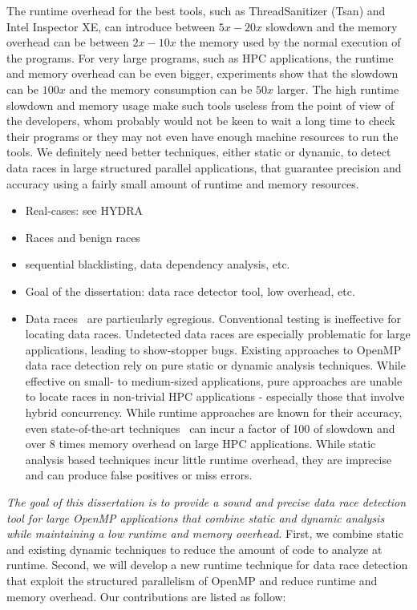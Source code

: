 The runtime overhead for the best tools, such as ThreadSanitizer (Tsan) and
Intel Inspector XE, can introduce between $5x-20x$ slowdown and the memory
overhead can be between $2x-10x$ the memory used by the normal execution of
the programs.
%
For very large programs, such as HPC applications, the runtime and memory
overhead can be even bigger, experiments show that the slowdown can be $100x$
and the memory consumption can be $50x$ larger.
%
The high runtime slowdown and memory usage make such tools useless from the
point of view of the developers, whom probably would not be keen to wait a
long time to check their programs or they may not even have enough machine
resources to run the tools.
%
We definitely need better techniques, either static or dynamic, to detect data
races in large structured parallel applications, that guarantee precision and
accuracy using a fairly small amount of runtime and memory resources.

\begin{itemize}
  \item Real-cases: see HYDRA
  \item Races and benign races
  \item sequential blacklisting, data dependency analysis, etc.
  \item Goal of the dissertation: data race detector tool, low overhead, etc.
  \item Data races~\cite{sus_common_2008} are particularly egregious.
    Conventional testing is ineffective for locating data races.
    Undetected data races are especially problematic for large applications,
    leading to show-stopper bugs.
    Existing approaches to OpenMP data race detection rely on pure static or
    dynamic analysis techniques.
    While effective on small- to medium-sized applications, pure approaches
    are unable to locate races in non-trivial HPC applications - especially
    those that involve hybrid concurrency.
    While runtime approaches are known for their accuracy, even
    state-of-the-art techniques~\cite{flanagan_fasttrack:_2009,tsan} can incur
    a factor of 100 of slowdown and over 8 times memory overhead on large HPC
    applications.
    While static analysis based techniques incur little runtime overhead, they
    are imprecise and can produce false positives or miss errors.
\end{itemize}

\emph{The goal of this dissertation is to provide a sound and precise data
  race detection tool for large OpenMP applications that combine static and
  dynamic analysis while maintaining a low runtime and memory overhead.}
%
First, we combine static and existing dynamic techniques to reduce the amount
of code to analyze at runtime.
%
Second, we will develop a new runtime technique for data race detection that
exploit the structured parallelism of OpenMP and reduce runtime and memory
overhead.
%
Our contributions are listed as follow:

